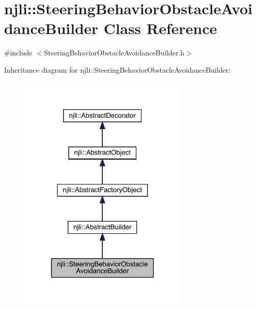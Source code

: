 \hypertarget{classnjli_1_1_steering_behavior_obstacle_avoidance_builder}{}\section{njli\+:\+:Steering\+Behavior\+Obstacle\+Avoidance\+Builder Class Reference}
\label{classnjli_1_1_steering_behavior_obstacle_avoidance_builder}


{\ttfamily \#include $<$Steering\+Behavior\+Obstacle\+Avoidance\+Builder.\+h$>$}



Inheritance diagram for njli\+:\+:Steering\+Behavior\+Obstacle\+Avoidance\+Builder\+:\nopagebreak
\begin{figure}[H]
\begin{center}
\leavevmode
\includegraphics[width=230pt]{classnjli_1_1_steering_behavior_obstacle_avoidance_builder__inherit__graph}
\end{center}
\end{figure}


